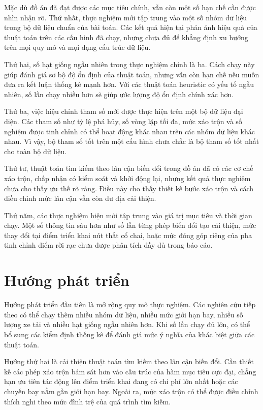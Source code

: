 Mặc dù đồ án đã đạt được các mục tiêu chính, vẫn còn một số hạn chế cần được nhìn nhận rõ. Thứ nhất, thực nghiệm mới tập trung vào một số nhóm dữ liệu trong bộ dữ liệu chuẩn của bài toán. Các kết quả hiện tại phản ánh hiệu quả của thuật toán trên các cấu hình đã chạy, nhưng chưa đủ để khẳng định xu hướng trên mọi quy mô và mọi dạng cấu trúc dữ liệu.

Thứ hai, số hạt giống ngẫu nhiên trong thực nghiệm chính là ba. Cách chạy này giúp đánh giá sơ bộ độ ổn định của thuật toán, nhưng vẫn còn hạn chế nếu muốn đưa ra kết luận thống kê mạnh hơn. Với các thuật toán heuristic có yếu tố ngẫu nhiên, số lần chạy nhiều hơn sẽ giúp ước lượng độ ổn định chính xác hơn.

Thứ ba, việc hiệu chỉnh tham số mới được thực hiện trên một bộ dữ liệu đại diện. Các tham số như tỷ lệ phá hủy, số vòng lặp tối đa, mức xáo trộn và số nghiệm được tinh chỉnh có thể hoạt động khác nhau trên các nhóm dữ liệu khác nhau. Vì vậy, bộ tham số tốt trên một cấu hình chưa chắc là bộ tham số tốt nhất cho toàn bộ dữ liệu.

Thứ tư, thuật toán tìm kiếm theo lân cận biến đổi trong đồ án đã có các cơ chế xáo trộn, chấp nhận có kiểm soát và khởi động lại, nhưng kết quả thực nghiệm chưa cho thấy ưu thế rõ ràng. Điều này cho thấy thiết kế bước xáo trộn và cách điều chỉnh mức lân cận vẫn còn dư địa cải thiện.

Thứ năm, các thực nghiệm hiện mới tập trung vào giá trị mục tiêu và thời gian chạy. Một số thông tin sâu hơn như số lần từng phép biến đổi tạo cải thiện, mức thay đổi tại điểm triển khai nút thắt cổ chai, hoặc mức đóng góp riêng của pha tinh chỉnh điểm rời rạc chưa được phân tích đầy đủ trong báo cáo.

\section{Hướng phát triển}

Hướng phát triển đầu tiên là mở rộng quy mô thực nghiệm. Các nghiên cứu tiếp theo có thể chạy thêm nhiều nhóm dữ liệu, nhiều mức giới hạn bay, nhiều số lượng xe tải và nhiều hạt giống ngẫu nhiên hơn. Khi số lần chạy đủ lớn, có thể bổ sung các kiểm định thống kê để đánh giá mức ý nghĩa của khác biệt giữa các thuật toán.

Hướng thứ hai là cải thiện thuật toán tìm kiếm theo lân cận biến đổi. Cần thiết kế các phép xáo trộn bám sát hơn vào cấu trúc của hàm mục tiêu cực đại, chẳng hạn ưu tiên tác động lên điểm triển khai đang có chi phí lớn nhất hoặc các chuyến bay nằm gần giới hạn bay. Ngoài ra, mức xáo trộn có thể được điều chỉnh thích nghi theo mức đình trệ của quá trình tìm kiếm.

